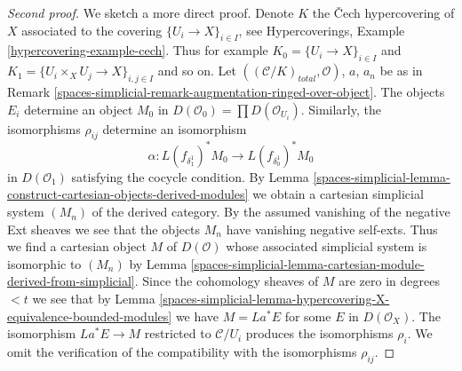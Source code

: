 \begin{proof}[Second proof]
We sketch a more direct proof.
Denote $K$ the {\v C}ech hypercovering of $X$ associated to the
covering $\{U_i \to X\}_{i \in I}$, see
Hypercoverings, Example \ref{hypercovering-example-cech}.
Thus for example $K_0 = \{U_i \to X\}_{i \in I}$ and
$K_1 = \{U_i \times_X U_j \to X\}_{i, j \in I}$ and so on.
Let $((\mathcal{C}/K)_{total}, \mathcal{O})$, $a$, $a_n$ be as in
Remark \ref{spaces-simplicial-remark-augmentation-ringed-over-object}.
The objects $E_i$ determine an object $M_0$ in
$D(\mathcal{O}_0) = \prod D(\mathcal{O}_{U_i})$.
Similarly, the isomorphisms $\rho_{ij}$ determine an isomorphism
$$
\alpha :
L(f_{\delta_1^1})^*M_0
\longrightarrow
L(f_{\delta_0^1})^*M_0
$$
in $D(\mathcal{O}_1)$ satisfying the cocycle condition.
By Lemma \ref{spaces-simplicial-lemma-construct-cartesian-objects-derived-modules}
we obtain a cartesian simplicial system $(M_n)$ of the derived
category. By the assumed vanishing of the negative Ext sheaves we see that
the objects $M_n$ have vanishing negative self-exts.
Thus we find a cartesian object $M$ of $D(\mathcal{O})$
whose associated simplicial system is isomorphic to $(M_n)$ by
Lemma \ref{spaces-simplicial-lemma-cartesian-module-derived-from-simplicial}.
Since the cohomology sheaves of $M$ are zero in degrees $< t$
we see that by Lemma \ref{spaces-simplicial-lemma-hypercovering-X-equivalence-bounded-modules}
we have $M = La^*E$ for some $E$ in $D(\mathcal{O}_X)$.
The isomorphism $La^*E \to M$ restricted to $\mathcal{C}/U_i$
produces the isomorphisms $\rho_i$. We omit the verification
of the compatibility with the isomorphisms $\rho_{ij}$.
\end{proof}

